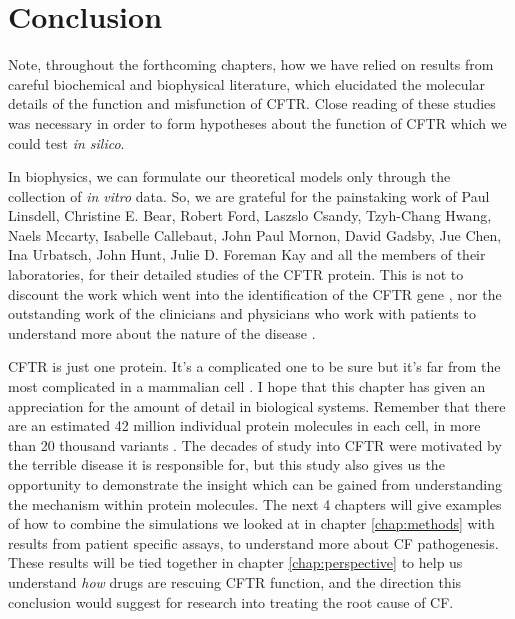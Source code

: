 \section{Conclusion}

Note, throughout the forthcoming chapters, how we have relied on results from careful biochemical and biophysical literature, which elucidated the molecular details of the function and misfunction of CFTR. Close reading of these studies was necessary in order to form hypotheses about the function of CFTR which we could test \textit {in silico}. 

In biophysics, we can formulate our theoretical models only through the collection of \textit{in vitro} data. So, we are grateful for the painstaking work of Paul Linsdell, Christine E. Bear, Robert Ford, Laszslo Csandy, Tzyh-Chang Hwang, Naels Mccarty, Isabelle Callebaut, John Paul Mornon, David Gadsby, Jue Chen, Ina Urbatsch, John Hunt, Julie D. Foreman Kay and all the members of their laboratories, for their detailed studies of the CFTR protein. This is not to discount the work which went into the identification of the CFTR gene \cite{riordan1989}, nor the outstanding work of the clinicians and physicians who work with patients to understand more about the nature of the disease \cite{roberts1957}.  



CFTR is just one protein. It's a complicated one to be sure but it's far from the most complicated in a mammalian cell \cite{saotome2018, zalk2015, chen2018a}. I hope that this chapter has given an appreciation for the amount of detail in biological systems. Remember that there are an estimated 42 million individual protein molecules in each cell, in more than 20 thousand variants \cite{ho2018, salzberg2018}. The decades of study into CFTR were motivated by the terrible disease it is responsible for, but this study also gives us the opportunity to demonstrate the insight which can be gained from understanding the mechanism within protein molecules. The next 4 chapters will give examples of how to combine the simulations we looked at in chapter \ref{chap:methods} with results from patient specific assays, to understand more about CF pathogenesis. These results will be tied together in chapter \ref{chap:perspective} to help us understand \textit{how} drugs are rescuing CFTR function, and the direction this conclusion would suggest for research into treating the root cause of CF.
